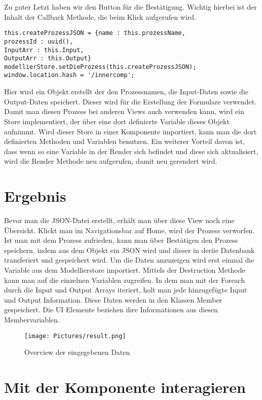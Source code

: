 \documentclass[a4paper,11pt]{scrreprt}
\begin{document}
Zu guter Letzt haben wir den Button für die Bestätigung. 
Wichtig hierbei ist der Inhalt der Callback Methode, die beim Klick aufgerufen wird.
\begin{lstlisting}
this.createProzessJSON = {name : this.prozessName, 
prozessId : uuid(),
InputArr : this.Input, 
OutputArr : this.Output}
modellierStore.setDieProzess(this.createProzessJSON);
window.location.hash = '/innercomp';
\end{lstlisting}
Hier wird ein Objekt erstellt der den Prozessnamen, die Input-Daten sowie die Output-Daten speichert. Dieser wird für die Erstellung der Formulare verwendet.
Damit man diesen Prozess bei anderen Views auch verwenden kann, wird ein Store implementiert, der über eine dort definierte Variable dieses Objekt aufnimmt. 
Wird dieser Store in einer Komponente importiert, kann man die dort definierten Methoden und Variablen benutzen. Ein weiterer Vorteil davon ist, dass wenn so eine Variable in der Render sich befindet und diese sich aktualisiert, wird die Render Methode neu aufgerufen, damit neu gerendert wird. 



\section{Ergebnis}
Bevor man die JSON-Datei erstellt, erhält man über diese View noch eine Übersicht. 
Klickt man im Navigationsbar auf Home, wird der Prozess verworfen. Ist man mit dem Prozess zufrieden, kann man über Bestätigen den Prozess speichern, indem aus dem Objekt ein JSON wird und dieser in deriie Datenbank transferiert und gespeichert wird. 
Um die Daten anzuzeigen wird erst einmal die Variable aus dem Modellierstore importiert. 
Mittels der Destruction Methode kann man auf die einzelnen Variablen zugreifen. In dem man mit der Foreach durch die Input und Output Arrays iteriert, holt man jede hinzugefügte Input und Output Information. 
Diese Daten werden in den Klassen Member gespeichert. Die UI Elemente beziehen ihre Informationen aus diesen Membervariablen. 

\begin{figure}[ht]
\centering
\texttt{[image: Pictures/result.png]}
\caption{Overview der eingegebenen Daten}
\label{JSON Bildung über Boxen}
\end{figure}
\hfill \break

\section{Mit der Komponente interagieren}
\end{document}
